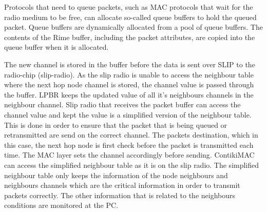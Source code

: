Protocols that need to queue packets, such as MAC protocols that wait for the radio medium to be free, can allocate so-called queue buffers to hold the queued packet. Queue buffers are dynamically allocated from a pool of queue buffers. The contents of the Rime buffer, including the packet attributes, are copied into the queue buffer when it is allocated.

The new channel is stored in the buffer before the data is sent over SLIP to the radio-chip (slip-radio). As the slip radio is unable to access the neighbour table where the next hop node channel is stored, the channel value is passed through the buffer. LPBR keeps the updated value of all it's neighbours channels in the neighbour channel. Slip radio that receives the packet buffer can access the channel value and kept the value is a simplified version of the neighbour table. This is done in order to ensure that the packet that is being queued or retransmitted are send on the correct channel. The packets destination, which in this case, the next hop node is first check before the packet is transmitted each time. The MAC layer sets the channel accordingly before sending. ContikiMAC can access the simplified neighbour table as it is on the slip radio. The simplified neighbour table only keeps the information of the node neighbours and neighbours channels which are the critical information in order to transmit packets correctly. The other information that is related to the neighbours conditions are monitored at the PC. 

